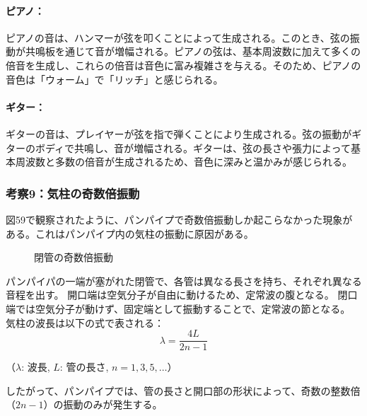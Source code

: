 \documentclass{article}
\begin{document}
\begin{spacing}{1.2}
    \paragraph*{ピアノ：}
    ピアノの音は、ハンマーが弦を叩くことによって生成される。このとき、弦の振動が共鳴板を通じて音が増幅される。ピアノの弦は、基本周波数に加えて多くの倍音を生成し、これらの倍音は音色に富み複雑さを与える。そのため、ピアノの音色は「ウォーム」で「リッチ」と感じられる。
    \paragraph*{ギター：}
    ギターの音は、プレイヤーが弦を指で弾くことにより生成される。弦の振動がギターのボディで共鳴し、音が増幅される。ギターは、弦の長さや張力によって基本周波数と多数の倍音が生成されるため、音色に深みと温かみが感じられる。
\end{spacing}

\subsubsection{考察9：気柱の奇数倍振動}
\begin{spacing}{1.2}
    図59で観察されたように、パンパイプで奇数倍振動しか起こらなかった現象がある。これはパンパイプ内の気柱の振動に原因がある。
    \begin{figure}[ht] %
        \centering
        \caption{閉管の奇数倍振動}
    \end{figure}
    \FloatBarrier
    パンパイパの一端が塞がれた閉管で、各管は異なる長さを持ち、それぞれ異なる音程を出す。
    開口端は空気分子が自由に動けるため、定常波の腹となる。
    閉口端では空気分子が動けず、固定端として振動することで、定常波の節となる。
    気柱の波長は以下の式で表される：
    \[
    \lambda = \frac{4L}{2n-1}
    \]
    \begin{center}
        （$\lambda$: 波長, $L$: 管の長さ, $n=1, 3, 5, \ldots$）
    \end{center}
    したがって、パンパイプでは、管の長さと開口部の形状によって、奇数の整数倍（$2n-1$）の振動のみが発生する。
\end{spacing}

\end{document}
